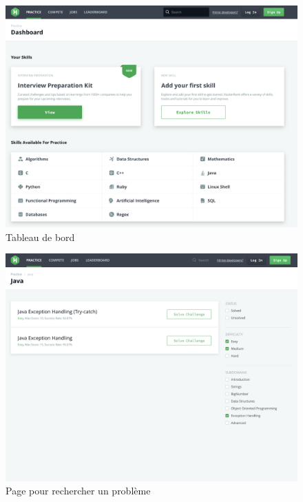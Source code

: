\begin{figure}[H]
    \includegraphics[width=\textwidth,height=0.35\textheight,keepaspectratio]{images/comparison/hacker-1.png}
    \centering
    \caption[Hackerrank : tableau de bord]{Tableau de bord}
\end{figure}

\begin{figure}[H]
    \includegraphics[width=\textwidth,height=0.35\textheight,keepaspectratio]{images/comparison/hacker-2.png}
    \centering
    \caption[Hackerrank : page pour rechercher un problème]{Page pour rechercher un problème}
\end{figure}

